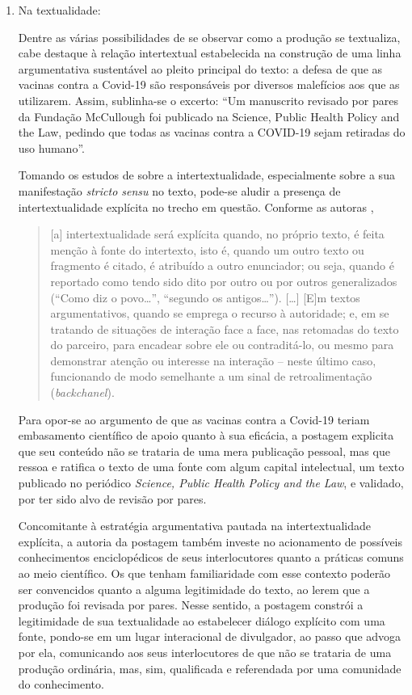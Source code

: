 \documentclass[portuguese]{textolivre}
\begin{document}
\begin{enumerate}
    \item Na textualidade:

    Dentre as várias possibilidades de se observar como a produção se textualiza, cabe destaque à relação intertextual estabelecida na construção de uma linha argumentativa sustentável ao pleito principal do texto: a defesa de que as vacinas contra a Covid-19 são responsáveis por diversos malefícios aos que as utilizarem. Assim, sublinha-se o excerto: “Um manuscrito revisado por pares da Fundação McCullough foi publicado na Science, Public Health Policy and the Law, pedindo que todas as vacinas contra a COVID-19 sejam retiradas do uso humano”.
    
Tomando os estudos de \textcite{koch2012intertextualidade} sobre a intertextualidade, especialmente sobre a sua manifestação \textit{stricto sensu} no texto, pode-se aludir a presença de intertextualidade explícita no trecho em questão. Conforme as autoras \cite[p. 28-29]{koch2012intertextualidade},

\begin{quote}
    [a] intertextualidade será explícita quando, no próprio texto, é feita menção à fonte do intertexto, isto é, quando um outro texto ou fragmento é citado, é atribuído a outro enunciador; ou seja, quando é reportado como tendo sido dito por outro ou por outros generalizados (“Como diz o povo…”, “segundo os antigos…”). […] [E]m textos argumentativos, quando se emprega o recurso à autoridade; e, em se tratando de situações de interação face a face, nas retomadas do texto do parceiro, para encadear sobre ele ou contraditá-lo, ou mesmo para demonstrar atenção ou interesse na interação – neste último caso, funcionando de modo semelhante a um sinal de retroalimentação (\textit{backchanel}).
\end{quote}

Para opor-se ao argumento de que as vacinas contra a Covid-19 teriam embasamento científico de apoio quanto à sua eficácia, a postagem explicita que seu conteúdo não se trataria de uma mera publicação pessoal, mas que ressoa e ratifica o texto de uma fonte com algum capital intelectual, um texto publicado no periódico \textit{Science, Public Health Policy and the Law}, e validado, por ter sido alvo de revisão por pares.

Concomitante à estratégia argumentativa pautada na intertextualidade explícita, a autoria da postagem também investe no acionamento de possíveis conhecimentos enciclopédicos de seus interlocutores quanto a práticas comuns ao meio científico. Os que tenham familiaridade com esse contexto poderão ser convencidos quanto a alguma legitimidade do texto, ao lerem que a produção foi revisada por pares. Nesse sentido, a postagem constrói a legitimidade de sua textualidade ao estabelecer diálogo explícito com uma fonte, pondo-se em um lugar interacional de divulgador, ao passo que advoga por ela, comunicando aos seus interlocutores de que não se trataria de uma produção ordinária, mas, sim, qualificada e referendada por uma comunidade do conhecimento.


\end{enumerate}
\end{document}
